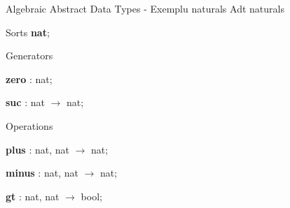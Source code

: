 \documentclass{beamer}
\begin{document}
\begin{frame}{Algebraic Abstract Data Types - Exemplu naturals}
	Adt naturals
	
	Sorts \textbf{nat};
	
	Generators
	
\hspace{0.5cm}		\textbf{zero} : nat;
		
\hspace{0.5cm}		\textbf{suc} : nat $\rightarrow$ nat;
		
	Operations
	
\hspace{0.5cm}		\textbf{plus} : nat, nat $\rightarrow$ nat;
		
\hspace{0.5cm}		\textbf{minus} : nat, nat $\rightarrow$ nat;
		
\hspace{0.5cm}		\textbf{gt} : nat, nat $\rightarrow$ bool;
		

\end{frame}
\end{document}
